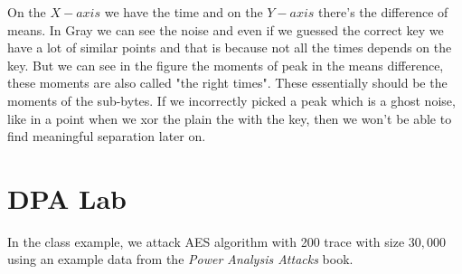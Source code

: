 On the $X-axis$ we have the time and on the $Y-axis$ there's the difference of means. In Gray we can see the noise and even if we guessed the correct key we have a lot of similar points and that is because not all the times depends on the key. But we can see in the figure the moments of peak in the means difference, these moments are also called "the right times". These essentially should be the moments of the sub-bytes. If we incorrectly picked a peak which is a ghost noise, like in a point when we xor the plain the with the key, then we won't be able to find meaningful separation later on.

\section{DPA Lab}
In the class example, we attack AES algorithm with 200 trace with size $30,000$ using an example data from the \textit{Power Analysis Attacks} book.

